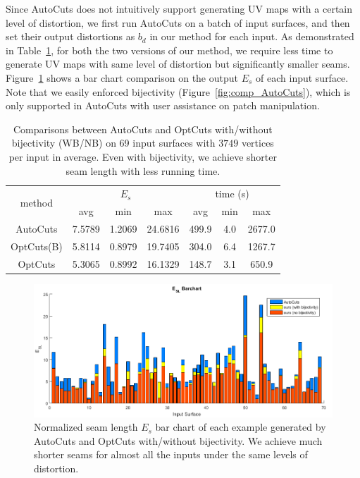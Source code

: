 Since AutoCuts does not intuitively support generating UV maps with a certain level of distortion, we first run AutoCuts on a batch of input surfaces, and then set their output distortions as $b_d$ in our method for each input. As demonstrated in Table~\ref{tb:comp_AutoCuts}, for both the two versions of our method, we require less time to generate UV maps with same level of distortion but significantly smaller seams. Figure~\ref{fig:ESLBar_compAutoCuts} shows a bar chart comparison on the output $E_{s}$ of each input surface. Note that we easily enforced bijectivity (Figure~\ref{fig:comp_AutoCuts}), which is only supported in AutoCuts with user assistance on patch manipulation.

\begin{table}[!h]
\centering
\caption{Comparisons between AutoCuts and OptCuts with/without bijectivity (WB/NB) on 69 input surfaces with $3749$ vertices per input in average. Even with bijectivity, we achieve shorter seam length with less running time.}
\label{tb:comp_AutoCuts}
\begin{tabular}{|c|ccc|ccc|}
\hline
\multirow{2}{*}{method} & \multicolumn{3}{c|}{$E_{s}$} & \multicolumn{3}{c|}{time (s)} \\ \cline{2-7} 
                        & avg      & min     & max      & avg      & min    & max       \\ \hline
AutoCuts                & 7.5789   & 1.2069  & 24.6816  & 499.9    & 4.0    & 2677.0    \\
OptCuts(B)               & 5.8114   & 0.8979  & 19.7405  & 304.0    & 6.4    & 1267.7     \\
OptCuts               & 5.3065   & 0.8992  & 16.1329  & 148.7    & 3.1    & 650.9    \\ \hline
\end{tabular}
\end{table}

\begin{figure}[!h]
\centering
\includegraphics[width=\linewidth]{fig/ESLBar_compAutoCuts.png}
\caption{Normalized seam length $E_{s}$ bar chart of each example generated by AutoCuts and OptCuts with/without bijectivity. We achieve much shorter seams for almost all the inputs under the same levels of distortion.}
\label{fig:ESLBar_compAutoCuts}
\end{figure}

